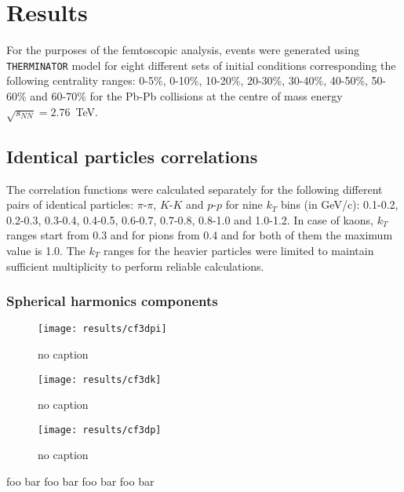 \chapter{Results}
  For the purposes of the femtoscopic analysis, events were generated using \verb|THERMINATOR| model for eight different sets of initial conditions corresponding the following centrality ranges: 0-5\%, 0-10\%, 10-20\%, 20-30\%, 30-40\%, 40-50\%, 50-60\% and 60-70\% for the Pb-Pb collisions at the centre of mass energy $\sqrt{s_{NN}} = 2.76$~TeV.
  \section{Identical particles correlations}
    The correlation functions were calculated separately for the following different pairs of identical particles: $\pi$-$\pi$, $K$-$K$ and  $p$-$p$ for nine $k_T$ bins (in GeV/c): 0.1-0.2, 0.2-0.3, 0.3-0.4, 0.4-0.5, 0.6-0.7, 0.7-0.8, 0.8-1.0 and 1.0-1.2.
    In case of kaons, $k_T$ ranges start from 0.3 and for pions from 0.4 and for both of them the maximum value is 1.0.
    The $k_T$ ranges for the heavier particles were limited to maintain sufficient multiplicity to perform reliable calculations.
    \subsection{Spherical harmonics components}
      \begin{figure}[h]
        \centering
        \centerline{\texttt{[image: results/cf3dpi]}}
        \caption{no caption}
      \label{fig:cf3dpi}
      \end{figure}

      \begin{figure}[h]
        \centering
        \centerline{\texttt{[image: results/cf3dk]}}
        \caption{no caption}
      \label{fig:cf3dk}
      \end{figure} 

      \begin{figure}[h]
        \centering
        \centerline{\texttt{[image: results/cf3dp]}}
        \caption{no caption}
      \label{fig:cf3dp}
      \end{figure}

      foo bar foo bar foo bar foo bar
    \FloatBarrier
